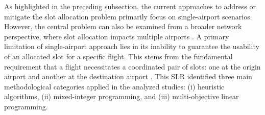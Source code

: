 As highlighted in the preceding subsection, the current approaches to address or
mitigate the slot allocation problem primarily focus on single-airport
scenarios.
%
However, the central problem can also be examined from a broader network
perspective, where slot allocation impacts multiple airports
\cite{zografos2017increasing}.
%
A primary limitation of single-airport approach lies in its inability to
guarantee the usability of an allocated slot for a specific flight.
%
This stems from the fundamental requirement that a flight necessitates a
coordinated pair of slots: one at the origin airport and another at the
destination airport \cite{wang_slot_2023}.
%
This \acrfull{SLR} identified three main methodological categories applied in
the analyzed studies: (i) heuristic algorithms, (ii) mixed-integer programming,
and (iii) multi-objective linear programming.



